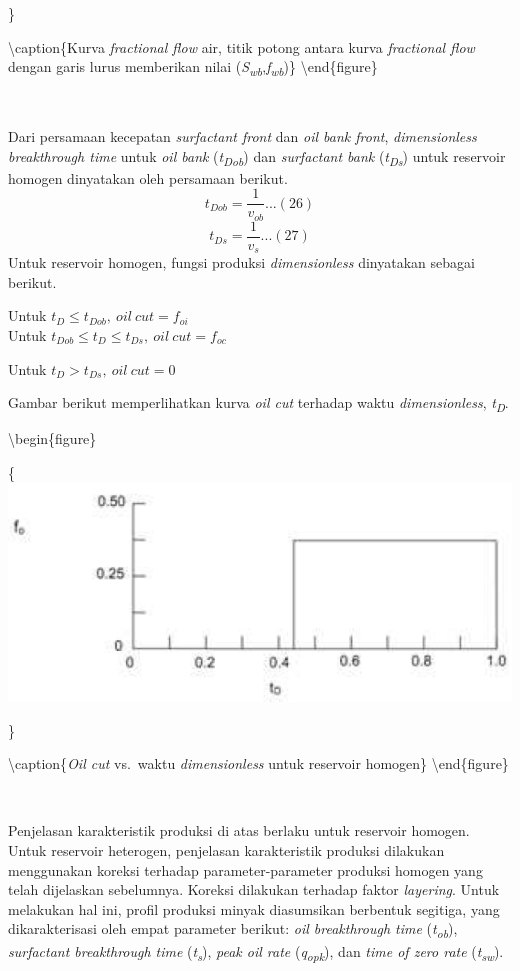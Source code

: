 \documentclass[
]{book}
\begin{document}
\}

\textbackslash caption\{Kurva \emph{fractional flow} air, titik potong antara kurva \emph{fractional flow} dengan garis lurus memberikan nilai (\emph{S\textsubscript{wb}},\emph{f\textsubscript{wb}})\}\label{fig:unnamed-chunk-57}
\textbackslash end\{figure\}

~

Dari persamaan kecepatan \emph{surfactant front} dan \emph{oil bank front}, \emph{dimensionless breakthrough time} untuk \emph{oil bank} (\emph{t\textsubscript{Dob}}) dan \emph{surfactant bank} (\emph{t\textsubscript{Ds}}) untuk reservoir homogen dinyatakan oleh persamaan berikut.
\[t_{Dob}=\frac{1}{v_{ob}}...(26)\]
\[t_{Ds}=\frac{1}{v_{s}}...(27)\]
Untuk reservoir homogen, fungsi produksi \emph{dimensionless} dinyatakan sebagai berikut.

Untuk \(t_{D} \leq t_{Dob},\ oil\ cut = f_{oi}\)\\

Untuk \(t_{Dob} \leq t_{D} \leq t_{Ds},\ oil\ cut = f_{oc}\)

Untuk \(t_{D} > t_{Ds},\ oil\ cut = 0\)

Gambar berikut memperlihatkan kurva \emph{oil cut} terhadap waktu \emph{dimensionless}, \emph{t\textsubscript{D}}.

\textbackslash begin\{figure\}

\{\centering \includegraphics[width=0.5\linewidth]{images/chemical/octd}

\}

\textbackslash caption\{\emph{Oil cut} vs.~waktu \emph{dimensionless} untuk reservoir homogen\}\label{fig:unnamed-chunk-58}
\textbackslash end\{figure\}

~

Penjelasan karakteristik produksi di atas berlaku untuk reservoir homogen. Untuk reservoir heterogen, penjelasan karakteristik produksi dilakukan menggunakan koreksi terhadap parameter-parameter produksi homogen yang telah dijelaskan sebelumnya. Koreksi dilakukan terhadap faktor \emph{layering}. Untuk melakukan hal ini, profil produksi minyak diasumsikan berbentuk segitiga, yang dikarakterisasi oleh empat parameter berikut: \emph{oil breakthrough time} (\emph{t\textsubscript{ob}}), \emph{surfactant breakthrough time} (\emph{t\textsubscript{s}}), \emph{peak oil rate} (\emph{q\textsubscript{opk}}), dan \emph{time of zero rate} (\emph{t\textsubscript{sw}}).
\end{document}
